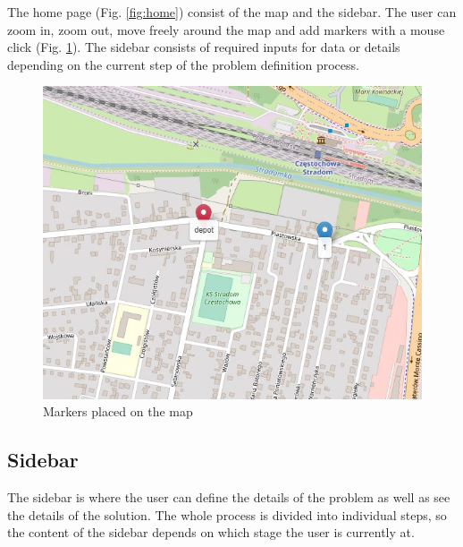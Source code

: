 \documentclass[a4paper,twoside,12pt]{book}
\begin{document}
The home page (Fig. \ref{fig:home}) consist of the map and the sidebar. The user can zoom in, zoom out, move freely around the map and add markers with a mouse click (Fig. \ref{fig:markers}). The sidebar consists of required inputs for data or details depending on the current step of the problem definition process.

\begin{figure}[htb]
\centering
\includegraphics[scale=0.5]{images/markers.jpg}
\caption{Markers placed on the map}
\label{fig:markers}
\end{figure}

\subsection{Sidebar}
The sidebar is where the user can define the details of the problem as well as see the details of the solution. The whole process is divided into individual steps, so the content of the sidebar depends on which stage the user is currently at.
\end{document}
